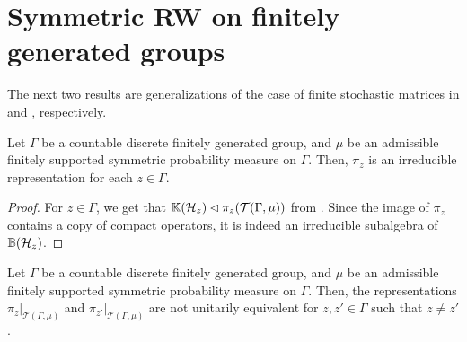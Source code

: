 \documentclass[12pt, class = article, crop = false, a4paper, twoside]{standalone}
\begin{document}
\section{Symmetric RW on finitely generated groups}
\label{sec:amenable}


\cite{DOMA17}

The next two results are generalizations of the case of finite stochastic matrices in \cite[Proposition 3.3]{DOMA17} and \cite[Proposition 3.4]{DOMA17}, respectively. 
\begin{proposition}

    Let $\Gamma$ be a countable discrete finitely generated group, and $\mu$ be an admissible finitely supported symmetric probability measure on $\Gamma$. Then, $\pi_{z}$ is an irreducible representation for each $z\in\Gamma$.
\end{proposition}

\begin{proof}

    For $z\in\Gamma$, we get that $\mathbb{K}(\mathcal{H}_{z})\lhd\pi_{z}(\mathcal{T}(\Gamma, \mu))$ from \cite[Proposition 4.4]{DOAD21}. Since the image of $\pi_{z}$ contains a copy of compact operators, it is indeed an irreducible subalgebra of $\mathbb{B}(\mathcal{H}_{z})$.
\end{proof}

\begin{proposition}

    Let $\Gamma$ be a countable discrete finitely generated group, and $\mu$ be an admissible finitely supported symmetric probability measure on $\Gamma$. Then, the representations $\pi_{z}|_{\mathcal{T}(\Gamma, \mu)}$ and $\pi_{z'}|_{\mathcal{T}(\Gamma, \mu)}$ are not unitarily equivalent for $z, z'\in\Gamma$ such that $z\neq z'$.
\end{proposition}
\end{document}
